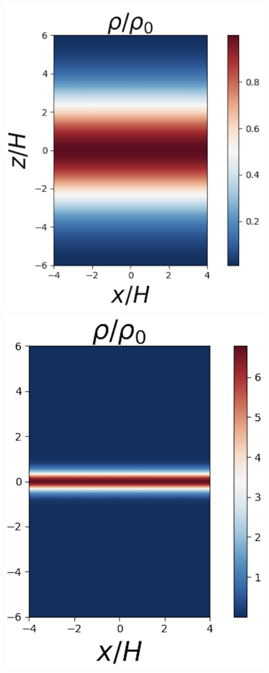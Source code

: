 \documentclass[fleqn,usenatbib]{mnras}
\begin{document}
\begin{figure}
\centering
\includegraphics[scale=0.39]{Figures/FlowField1.png}
\includegraphics[scale=0.39]{Figures/FlowField2.png}

\end{figure}
\end{document}
